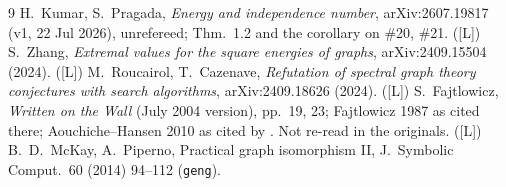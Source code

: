 \documentclass[10pt]{article}
\newcommand{\tier}[1]{\textsf{[#1]}}
\newcommand{\tL}{\tier{L}}
\begin{document}
\begin{thebibliography}{9}\small
{} H.\ Kumar, S.\ Pragada, \emph{Energy and independence number}, arXiv:2607.19817 (v1, 22 Jul 2026), unrefereed; Thm.~1.2 and the corollary on \#20, \#21. (\tL)
 S.\ Zhang, \emph{Extremal values for the square energies of graphs}, arXiv:2409.15504 (2024). (\tL)
 M.\ Roucairol, T.\ Cazenave, \emph{Refutation of spectral graph theory conjectures with search algorithms}, arXiv:2409.18626 (2024). (\tL)
 S.\ Fajtlowicz, \emph{Written on the Wall} (July 2004 version), pp.\ 19, 23; Fajtlowicz 1987 as cited there; Aouchiche--Hansen 2010 as cited by \cite{kp}. Not re-read in the originals. (\tL)
 B.\ D.\ McKay, A.\ Piperno, Practical graph isomorphism II, J.\ Symbolic Comput.\ 60 (2014) 94--112 (\texttt{geng}).
\end{thebibliography}
\end{document}
